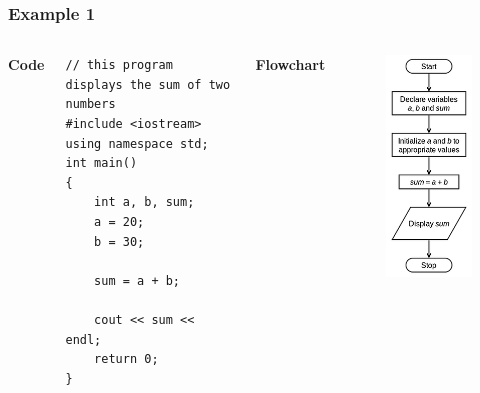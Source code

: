\documentclass{beamer}
\begin{document}
\begin{frame}[fragile]
    \frametitle{Example 1}
    \begin{columns}
    \textbf{Code}
    \lstset{style=mystyle}
    \begin{lstlisting}
// this program displays the sum of two numbers
#include <iostream>
using namespace std;
int main()
{
    int a, b, sum;
    a = 20;
    b = 30;

    sum = a + b;

    cout << sum << endl;
    return 0;
}\end{lstlisting}
    \textbf{Flowchart}
    \begin{figure}
        \centering
        \includegraphics[scale=0.55]{p1flow}
    \end{figure}
    \end{columns}
\end{frame}
\end{document}

